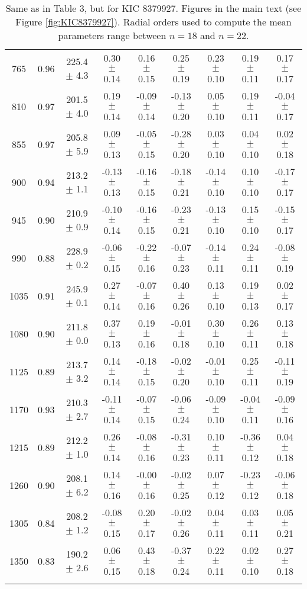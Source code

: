 \documentclass[twocolumn]{aastex61}%
\begin{document}
\begin{table*}[ht]
\begin{tabular}{ccc|ccccc|c}
765 & 0.96 & 225.4 $\pm$ 4.3 & 0.30 $\pm$ 0.14 & 0.16 $\pm$ 0.15 & 0.25 $\pm$ 0.19 & 0.23 $\pm$ 0.10 & 0.19 $\pm$ 0.11 & 0.17 $\pm$ 0.17\\
810 & 0.97 & 201.5 $\pm$ 4.0 & 0.19 $\pm$ 0.14 & -0.09 $\pm$ 0.14 & -0.13 $\pm$ 0.20 & 0.05 $\pm$ 0.10 & 0.19 $\pm$ 0.11 & -0.04 $\pm$ 0.17\\
855 & 0.97 & 205.8 $\pm$ 5.9 & 0.09 $\pm$ 0.13 & -0.05 $\pm$ 0.15 & -0.28 $\pm$ 0.20 & 0.03 $\pm$ 0.10 & 0.04 $\pm$ 0.10 & 0.02 $\pm$ 0.18\\
900 & 0.94 & 213.2 $\pm$ 1.1 & -0.13 $\pm$ 0.13 & -0.16 $\pm$ 0.15 & -0.18 $\pm$ 0.21 & -0.14 $\pm$ 0.10 & 0.10 $\pm$ 0.10 & -0.17 $\pm$ 0.17\\
945 & 0.90 & 210.9 $\pm$ 0.9 & -0.10 $\pm$ 0.14 & -0.16 $\pm$ 0.15 & -0.23 $\pm$ 0.21 & -0.13 $\pm$ 0.10 & 0.15 $\pm$ 0.10 & -0.15 $\pm$ 0.17\\
990 & 0.88 & 228.9 $\pm$ 0.2 & -0.06 $\pm$ 0.15 & -0.22 $\pm$ 0.16 & -0.07 $\pm$ 0.23 & -0.14 $\pm$ 0.11 & 0.24 $\pm$ 0.11 & -0.08 $\pm$ 0.19\\
1035 & 0.91 & 245.9 $\pm$ 0.1 & 0.27 $\pm$ 0.14 & -0.07 $\pm$ 0.16 & 0.40 $\pm$ 0.26 & 0.13 $\pm$ 0.10 & 0.19 $\pm$ 0.13 & 0.02 $\pm$ 0.17\\
1080 & 0.90 & 211.8 $\pm$ 0.0 & 0.37 $\pm$ 0.13 & 0.19 $\pm$ 0.16 & -0.01 $\pm$ 0.18 & 0.30 $\pm$ 0.10 & 0.26 $\pm$ 0.11 & 0.13 $\pm$ 0.18\\
1125 & 0.89 & 213.7 $\pm$ 3.2 & 0.14 $\pm$ 0.14 & -0.18 $\pm$ 0.15 & -0.02 $\pm$ 0.20 & -0.01 $\pm$ 0.10 & 0.25 $\pm$ 0.11 & -0.11 $\pm$ 0.19\\
1170 & 0.93 & 210.3 $\pm$ 2.7 & -0.11 $\pm$ 0.14 & -0.07 $\pm$ 0.15 & -0.06 $\pm$ 0.24 & -0.09 $\pm$ 0.10 & -0.04 $\pm$ 0.11 & -0.09 $\pm$ 0.16\\
1215 & 0.89 & 212.2 $\pm$ 1.0 & 0.26 $\pm$ 0.14 & -0.08 $\pm$ 0.16 & -0.31 $\pm$ 0.23 & 0.10 $\pm$ 0.11 & -0.36 $\pm$ 0.12 & 0.04 $\pm$ 0.18\\
1260 & 0.90 & 208.1 $\pm$ 6.2 & 0.14 $\pm$ 0.16 & -0.00 $\pm$ 0.16 & -0.02 $\pm$ 0.25 & 0.07 $\pm$ 0.12 & -0.23 $\pm$ 0.12 & -0.06 $\pm$ 0.18\\
1305 & 0.84 & 208.2 $\pm$ 1.2 & -0.08 $\pm$ 0.15 & 0.20 $\pm$ 0.17 & -0.02 $\pm$ 0.26 & 0.04 $\pm$ 0.11 & 0.03 $\pm$ 0.11 & 0.05 $\pm$ 0.21\\
1350 & 0.83 & 190.2 $\pm$ 2.6 & 0.06 $\pm$ 0.15 & 0.43 $\pm$ 0.18 & -0.37 $\pm$ 0.24 & 0.22 $\pm$ 0.11 & 0.02 $\pm$ 0.10 & 0.27 $\pm$ 0.18\\\vspace{-0.35cm}
\end{tabular}
\caption{Same as in Table 3, but for KIC 8379927. Figures in the main text (see Figure \ref{fig:KIC8379927}). Radial orders used to compute the mean parameters range between $n=18$ and $n=22$.}\label{tab:8379927}\vspace{-1.5cm}
\end{table*}
\end{document}

